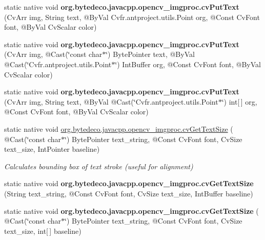 \begin{DoxyCompactItemize}
\item 
\mbox{\label{group__imgproc__c_gaf21746d9b276c4e4d3106cb3fbeeae73}} 
static native void {\bfseries org.\+bytedeco.\+javacpp.\+opencv\+\_\+imgproc.\+cv\+Put\+Text} (Cv\+Arr img, String text, @By\+Val Cv\+fr.antproject.utils.Point org, @Const Cv\+Font font, @By\+Val Cv\+Scalar color)
\item 
\mbox{\label{group__imgproc__c_ga97181bc021938d68aa28974ced75746f}} 
static native void {\bfseries org.\+bytedeco.\+javacpp.\+opencv\+\_\+imgproc.\+cv\+Put\+Text} (Cv\+Arr img, @Cast(\char`\"{}const char$\ast$\char`\"{}) Byte\+Pointer text, @By\+Val @Cast(\char`\"{}Cv\+fr.antproject.utils.Point$\ast$\char`\"{}) Int\+Buffer org, @Const Cv\+Font font, @By\+Val Cv\+Scalar color)
\item 
\mbox{\label{group__imgproc__c_ga3461298f05ca3166f817aaf0d7d617e6}} 
static native void {\bfseries org.\+bytedeco.\+javacpp.\+opencv\+\_\+imgproc.\+cv\+Put\+Text} (Cv\+Arr img, String text, @By\+Val @Cast(\char`\"{}Cv\+fr.antproject.utils.Point$\ast$\char`\"{}) int\mbox{[}$\,$\mbox{]} org, @Const Cv\+Font font, @By\+Val Cv\+Scalar color)
\item 
static native void \hyperlink{group__imgproc__c_gaadcbbe95eaad71798726cedfd442c08f}{org.\+bytedeco.\+javacpp.\+opencv\+\_\+imgproc.\+cv\+Get\+Text\+Size} ( @Cast(\char`\"{}const char$\ast$\char`\"{}) Byte\+Pointer text\+\_\+string, @Const Cv\+Font font, Cv\+Size text\+\_\+size, Int\+Pointer baseline)
\begin{DoxyCompactList}\small\item\em Calculates bounding box of text stroke (useful for alignment) \end{DoxyCompactList}\item 
\mbox{\label{group__imgproc__c_ga7aae4f6758c2093c79ef9e243ce4cc0d}} 
static native void {\bfseries org.\+bytedeco.\+javacpp.\+opencv\+\_\+imgproc.\+cv\+Get\+Text\+Size} (String text\+\_\+string, @Const Cv\+Font font, Cv\+Size text\+\_\+size, Int\+Buffer baseline)
\item 
\mbox{\label{group__imgproc__c_gaf42c240c3f57547d032750560abd1626}} 
static native void {\bfseries org.\+bytedeco.\+javacpp.\+opencv\+\_\+imgproc.\+cv\+Get\+Text\+Size} ( @Cast(\char`\"{}const char$\ast$\char`\"{}) Byte\+Pointer text\+\_\+string, @Const Cv\+Font font, Cv\+Size text\+\_\+size, int\mbox{[}$\,$\mbox{]} baseline)

\end{DoxyCompactItemize}
